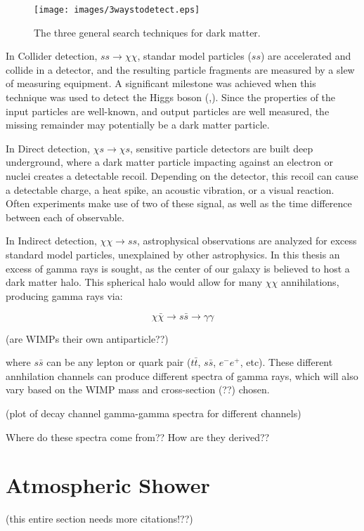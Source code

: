 \begin{figure}[ht]
  \centering
  \texttt{[image: images/3waystodetect.eps]}
  \caption[3 Search Techniques]{
    The three general search techniques for dark matter.}
  \label{fig:3_searches}
\end{figure}

In Collider detection, $ss \rightarrow \chi\chi$, standar model particles ($ss$) are accelerated and collide in a detector, and the resulting particle fragments are measured by a slew of measuring equipment.
A significant milestone was achieved when this technique was used to detect the Higgs boson (\cite{Higs_ATLAS},\cite{Higgs_CMS}).
Since the properties of the input particles are well-known, and output particles are well measured, the missing remainder may potentially be a dark matter particle.

In Direct detection, $\chi s \rightarrow \chi s$, sensitive particle detectors are built deep underground, where a dark matter particle impacting against an electron or nuclei creates a detectable recoil.
Depending on the detector, this recoil can cause a detectable charge, a heat spike, an acoustic vibration, or a visual reaction.
Often experiments make use of two of these signal, as well as the time difference between each of observable.

In Indirect detection, $\chi\chi \rightarrow ss$, astrophysical observations are analyzed for excess standard model particles, unexplained by other astrophysics.
In this thesis an excess of gamma rays is sought, as the center of our galaxy is believed to host a dark matter halo.
This spherical halo would allow for many $\chi\chi$ annihilations, producing gamma rays via: 

$$\chi\bar{\chi} \rightarrow s\bar{s} \rightarrow \gamma\gamma$$

{\color{red}(are WIMPs their own antiparticle??)}

where $s\bar{s}$ can be any lepton or quark pair ($t\bar{t}$, $s\bar{s}$, $e^{-}e^{+}$, etc).
These different annhilation channels can produce different spectra of gamma rays, which will also vary based on the WIMP mass and cross-section {\color{red}(??)} chosen.

(plot of decay channel gamma-gamma spectra for different channels)

{\color{red}Where do these spectra come from??}
{\color{red}How are they derived??}


\section{Atmospheric Shower}
{\color{red}(this entire section needs more citations!??)}

